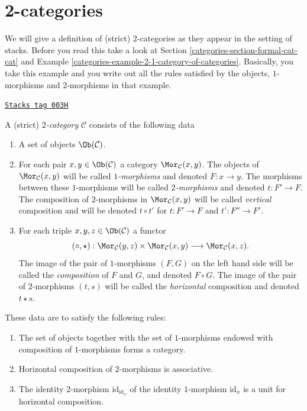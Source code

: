 \section{2-categories}
\label{categories-section-2-categories}
We will give a definition of (strict) $2$-categories as they appear
in the setting of stacks. Before you read this take a look at
Section \ref{categories-section-formal-cat-cat} and
Example \ref{categories-example-2-1-category-of-categories}.
Basically, you take this example
and you write out all the rules satisfied by the objects, $1$-morphisms
and $2$-morphisms in that example.

\begin{definition}[2 category]
\label{categories-definition-2-category}
\href{https://stacks.math.columbia.edu/tag/003H}{\texttt{Stacks tag 003H}}

A (strict) {\it $2$-category} $\mathcal{C}$ consists of the following data
\begin{enumerate}
\item A set of objects $\Ob(\mathcal{C})$.
\item For each pair $x, y \in \Ob(\mathcal{C})$
a category $\Mor_\mathcal{C}(x, y)$. The objects of
$\Mor_\mathcal{C}(x, y)$ will be called {\it $1$-morphisms}
and denoted $F : x \to y$. The morphisms between these $1$-morphisms
will be called {\it $2$-morphisms} and denoted $t : F' \to F$.
The composition of $2$-morphisms in $\Mor_\mathcal{C}(x, y)$
will be called {\it vertical} composition and will be
denoted $t \circ t'$ for $t : F' \to F$ and $t' : F'' \to F'$.
\item For each triple $x, y, z\in \Ob(\mathcal{C})$ a
functor
$$
(\circ, \star) :
\Mor_\mathcal{C}(y, z) \times \Mor_\mathcal{C}(x, y)
\longrightarrow
\Mor_\mathcal{C}(x, z).
$$
The image of the pair of $1$-morphisms $(F, G)$ on the left hand side
will be called the {\it composition} of $F$ and $G$, and denoted
$F\circ G$. The image of the pair of $2$-morphisms $(t, s)$ will
be called the {\it horizontal} composition and denoted $t \star s$.
\end{enumerate}
These data are to satisfy the following rules:
\begin{enumerate}
\item The set of objects together with the set of $1$-morphisms endowed
with composition of $1$-morphisms forms a category.
\item Horizontal composition of $2$-morphisms is associative.
\item The identity $2$-morphism $\text{id}_{\text{id}_x}$
of the identity $1$-morphism $\text{id}_x$ is a unit for
horizontal composition.
\end{enumerate}
\end{definition}

